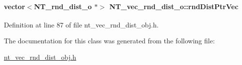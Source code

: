\paragraph[{rndDistPtrVec}]{\setlength{\rightskip}{0pt plus 5cm}vector$<${\bf NT\_\-rnd\_\-dist\_\-o} $\ast$$>$ {\bf NT\_\-vec\_\-rnd\_\-dist\_\-o::rndDistPtrVec}}\hfill\label{class_n_t__vec__rnd__dist__o_adad8eecb4019a95d9d3886833670b16c}


Definition at line 87 of file nt\_\-vec\_\-rnd\_\-dist\_\-obj.h.



The documentation for this class was generated from the following file:\begin{DoxyCompactItemize}
\item 
\hyperlink{nt__vec__rnd__dist__obj_8h}{nt\_\-vec\_\-rnd\_\-dist\_\-obj.h}\end{DoxyCompactItemize}
